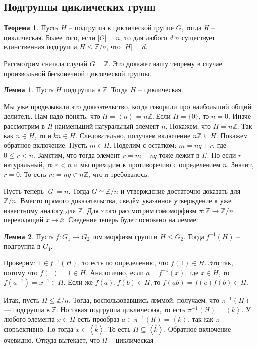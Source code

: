 \documentclass[10pt,a4paper,oneside]{book}
\theoremstyle{definition}
\newtheorem{thm}{\color{red!40!black}Теорема}
\newtheorem{lem}{\color{green!50!black}Лемма}
\renewcommand{\leq}{\leqslant}
\newcommand{\mb}[1]{\mathbb{#1}}
\newcommand{\ovl}{\overline}
\def\lan{\left\langle }
\def\ran{\right\rangle}
\def\thrm{\begin{thm}}
\def\ethrm{\end{thm}}
\def\lm{\begin{lem}}
\def\elm{\end{lem}}
\begin{document}
\subsection{Подгруппы циклических групп}



\thrm Пусть $H$ -- подгруппа в циклической группе $G$, тогда $H$ -- циклическая. Более того, если $|G|=n$, то для любого $d|n$ существует единственная подгруппа $H\leq \mb Z/n$, что $|H|=d$. 
\ethrm
\proof

Рассмотрим сначала случай $G=\mb Z$. Это докажет нашу теорему в случае произвольной бесконечной циклической группы.

\lm Пусть $H$ подгруппа в $\mb Z$. Тогда $H$ -- циклическая.
\elm
\proof Мы уже проделывали это доказательство, когда говорили про наибольший общий делитель. Нам надо понять, что $H=\lan n\ran =n\mb Z$. Если $H=\{0\}$, то $n=0$. Иначе рассмотрим в $H$ наименьший натуральный элемент $n$. Покажем, что $H=n\mb Z$. Так как $n \in H$, то и $kn \in H$. Следовательно, получаем включение $n\mb Z \subseteq H$. Покажем обратное включение. Пусть $m\in H$. Поделим с остатком: $m=nq+r$, где $0\leq r<n$. Заметим, что тогда элемент $r=m-nq$ тоже лежит в $H$. Но если $r$ натуральный, то $r<n$ и мы приходим к противоречию с определением $n$. Значит,  $r=0$. То есть $m=nq \in n \mb Z$, что и требовалось. 
\endproof

Пусть теперь $|G|=n$. Тогда $G\simeq \mb Z/n$ и утверждение достаточно доказать для $\mb Z/n$. Вместо прямого доказательства, сведём указанное утверждение к уже известному аналогу для $\mb Z$. Для этого рассмотрим гомоморфизм $\pi\colon \mb Z \to \mb Z/n$ переводящий $x\to \ovl{x}$. Сведение теперь будет основано на лемме:

\lm Пусть $f\colon G_1\to G_2$ гомоморфизм групп и $H\leq G_2$. Тогда $f^{-1}(H)$ -- подгруппа в $G_1$.
\elm
\proof Проверим: $1 \in f^{-1}(H)$, то есть по определению, что $f(1)\in H$. Это так, потому что $f(1)=1\in H$. Аналогично, если $a=f^{-1}(x)$, где $x \in H$, то $f(a^{-1})=x^{-1}\in H$. Если же $f(a), f(b) \in H$, то $f(ab)=f(a)f(b)\in H$. 
\endproof

Итак, пусть $H\leq \mb Z/n$. Тогда, воспользовавшись леммой, получаем, что  $\pi^{-1}(H)$ ---  подгруппа в $\mb Z$. Но такая подгруппа циклическая, то есть $\pi^{-1}(H)=\lan k \ran$. У любого элемента $x\in H$ есть прообраз $a\in \pi^{-1}(H)=\lan k \ran$, так как $\pi$ сюръективно. Но тогда $x\in \lan \ovl{k} \ran$. То есть $H\subseteq \lan \ovl{k}\ran$. Обратное включение очевидно. Откуда вытекает, что $H$ -- циклическая.
\end{document}
